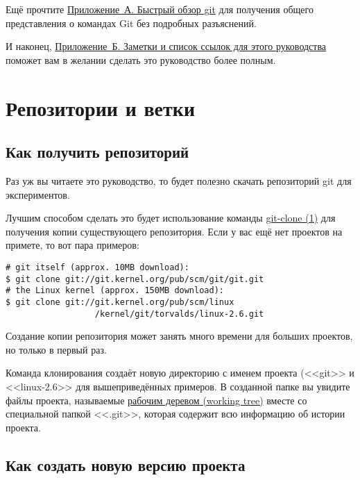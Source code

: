 \documentclass[a4paper, 12pt]{report}
\begin{document}
Ещё прочтите \href{#appendixa}{Приложение~А. Быстрый обзор git} для получения
общего представления о командах Git без подробных разъяснений.

И наконец, \href{#appendixb}{Приложение~Б. Заметки и список ссылок для этого
руководства} поможет вам в желании сделать это руководство более
полным.
%
%
\chapter{Репозитории и ветки}
\hypertarget{#chapter1}{}

\section{Как получить репозиторий}

Раз уж вы читаете это руководство, то будет полезно скачать репозиторий git для 
экспериментов.

Лучшим способом сделать это будет использование команды
\href{http://www.kernel.org/pub/software/scm/git/docs/git-clone.html}{git-clone (1)}
для получения копии существующего репозитория. Если у вас ещё нет проектов на 
примете, то вот пара примеров:

\begin{lstlisting}
# git itself (approx. 10MB download):
$ git clone git://git.kernel.org/pub/scm/git/git.git
# the Linux kernel (approx. 150MB download):
$ git clone git://git.kernel.org/pub/scm/linux
                  /kernel/git/torvalds/linux-2.6.git
\end{lstlisting}

Создание копии репозитория может занять много времени для больших проектов, но 
только в первый раз.

Команда клонирования создаёт новую директорию с именем проекта (<<git>> и <<linux-2.6>>
для вышеприведённых примеров. В созданной папке вы увидите файлы проекта, называемые
\href{#def_working_tree}{рабочим деревом (working tree)} вместе со специальной папкой 
<<.git>>, которая содержит всю информацию об истории проекта.



\section{Как создать новую версию проекта}
\end{document}
